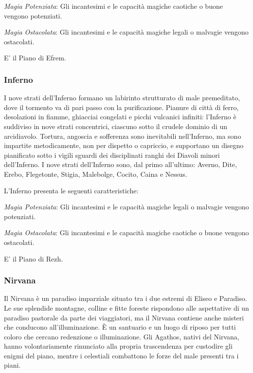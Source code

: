 \documentclass[a4paper,twoside,openany]{book}
\begin{document}
\begin{multicols}{2}
\emph{Magia Potenziata}: Gli incantesimi e le capacità magiche caotiche o buone vengono potenziati.

\emph{Magia Ostacolata}: Gli incantesimi e le capacità magiche legali o malvagie vengono ostacolati.

E' il Piano di Efrem.

\subsubsection{Inferno}\label{pianoinferno}
I nove strati dell'Inferno formano un labirinto strutturato di male premeditato, dove il tormento va di pari passo con la purificazione. Pianure di città di ferro, desolazioni in fiamme, ghiacciai congelati e picchi vulcanici infiniti: l'Inferno è suddiviso in nove strati concentrici, ciascuno sotto il crudele dominio di un arcidiavolo. Tortura, angoscia e sofferenza sono inevitabili nell'Inferno, ma sono impartite metodicamente, non per dispetto o capriccio, e supportano un disegno pianificato sotto i vigili sguardi dei disciplinati ranghi dei Diavoli minori dell'Inferno. I nove strati dell'Inferno sono, dal primo all'ultimo: Averno, Dite, Erebo, Flegetonte, Stigia, Malebolge, Cocito, Caina e Nessus.

L'Inferno presenta le seguenti caratteristiche:

\emph{Magia Potenziata}: Gli incantesimi e le capacità magiche legali o malvagie vengono potenziati.

\emph{Magia Ostacolata}: Gli incantesimi e le capacità magiche caotiche o buone vengono ostacolati.

E' il Piano di Rezh.

\subsubsection{Nirvana}\label{pianonirvana}
Il Nirvana è un paradiso imparziale situato tra i due estremi di Eliseo e Paradiso. Le sue splendide montagne, colline e fitte foreste rispondono alle aspettative di un paradiso pastorale da parte dei viaggiatori, ma il Nirvana contiene anche misteri che conducono all'illuminazione. È un santuario e un luogo di riposo per tutti coloro che cercano redenzione o illuminazione. Gli Agathos, nativi del Nirvana, hanno volontariamente rinunciato alla propria trascendenza per custodire gli enigmi del piano, mentre i celestiali combattono le forze del male presenti tra i piani.


\end{multicols}
\end{document}
